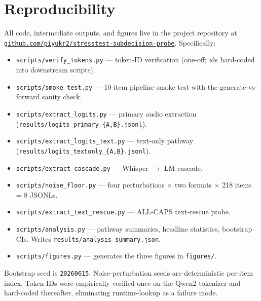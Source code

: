 \documentclass[11pt]{article}
\begin{document}
\section*{Reproducibility}

All code, intermediate outputs, and figures live in the project
repository at
\href{https://github.com/piyukr2/stresstest-subdecision-probe}
{\texttt{github.com/piyukr2/stresstest-subdecision-probe}}.
Specifically:

\begin{itemize}
    \item \texttt{scripts/verify\_tokens.py} --- token-ID
    verification (one-off; ids hard-coded into downstream scripts).
    \item \texttt{scripts/smoke\_test.py} --- 10-item pipeline
    smoke test with the generate-vs-forward sanity check.
    \item \texttt{scripts/extract\_logits.py} --- primary audio
    extraction (\texttt{results/logits\_primary\_\{A,B\}.jsonl}).
    \item \texttt{scripts/extract\_logits\_text.py} --- text-only
    pathway (\texttt{results/logits\_textonly\_\{A,B\}.jsonl}).
    \item \texttt{scripts/extract\_cascade.py} --- Whisper
    $\rightarrow$ LM cascade.
    \item \texttt{scripts/noise\_floor.py} --- four perturbations
    $\times$ two formats $\times$ 218 items = 8 JSONLs.
    \item \texttt{scripts/extract\_text\_rescue.py} --- ALL-CAPS
    text-rescue probe.
    \item \texttt{scripts/analysis.py} --- pathway summaries,
    headline statistics, bootstrap CIs. Writes
    \texttt{results/analysis\_summary.json}.
    \item \texttt{scripts/figures.py} --- generates the three
    figures in \texttt{figures/}.
\end{itemize}

Bootstrap seed is \texttt{20260615}. Noise-perturbation seeds are
deterministic per-item index. Token IDs were empirically verified
once on the Qwen2 tokenizer and hard-coded thereafter, eliminating
runtime-lookup as a failure mode.
\end{document}

